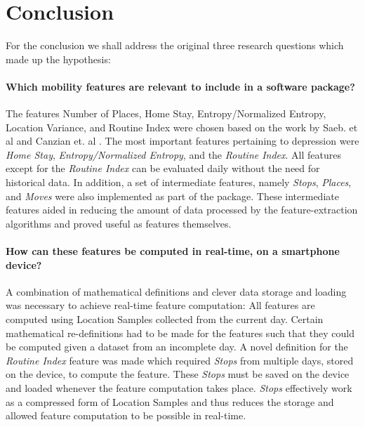 \chapter{Conclusion}
\label{chapter:08}

For the conclusion we shall address the original three research questions which made up the hypothesis:

\subsubsection*{Which mobility features are relevant to include in a software package?}
The features Number of Places, Home Stay, Entropy/Normalized Entropy, Location Variance, and Routine Index were chosen based on the work by Saeb. et al \cite{Saeb2015} and Canzian et. al \cite{Canzian2015}. The most important features pertaining to depression were \textit{Home Stay}, \textit{Entropy/Normalized Entropy}, and the \textit{Routine Index}. All features except for the \textit{Routine Index} can be evaluated daily without the need for historical data. In addition, a set of intermediate features, namely \textit{Stops}, \textit{Places}, and \textit{Moves} were also implemented as part of the package. These intermediate features aided in reducing the amount of data processed by the feature-extraction algorithms and proved useful as features themselves.

\subsubsection*{How can these features be computed in real-time, on a smartphone device?}
A combination of mathematical definitions and clever data storage and loading was necessary to achieve real-time feature computation: All features are computed using Location Samples collected from the current day. Certain mathematical re-definitions had to be made for the features such that they could be computed given a dataset from an incomplete day. A novel definition for the \textit{Routine Index} feature was made which required \textit{Stops} from multiple days, stored on the device, to compute the feature. These \textit{Stops} must be saved on the device and loaded whenever the feature computation takes place. \textit{Stops} effectively work as a compressed form of Location Samples and thus reduces the storage and allowed feature computation to be possible in real-time.


